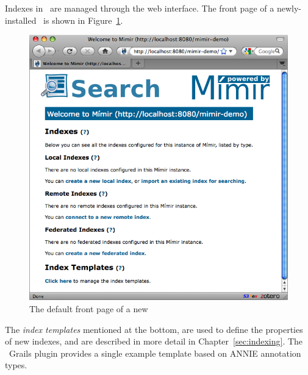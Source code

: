 Indexes in \Mimir\ are managed through the web interface.  The front page of a
newly-installed \Mimir\ is shown in Figure~\ref{fig:front-page}.
%
\begin{figure}[htb!]
\begin{center}
\includegraphics[scale=0.5]{img/default-front-page}
\end{center}
\caption{The default front page of a new \Mimir}
\label{fig:front-page}
\end{figure}
%
The {\em index templates} mentioned at the bottom, are used to define the
properties of new indexes, and are described in more detail in
Chapter~\ref{sec:indexing}.  The \Mimir\ Grails plugin provides a single
example template based on ANNIE annotation types.

